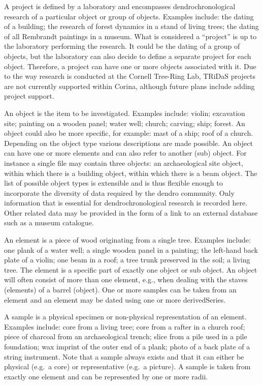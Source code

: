 \begin{description*}
\item[A project] is defined by a laboratory and encompasses dendrochronological research of a particular object or group of objects.  Examples include: the dating of a building; the research of forest dynamics in a stand of living trees; the dating of all Rembrandt paintings in a museum. What is considered a ``project'' is up to the laboratory performing the research. It could be the dating of a group of objects, but the laboratory can also decide to define a separate project for each object. Therefore, a project can have one or more objects associated with it.  Due to the way research is conducted at the Cornell Tree-Ring Lab, TRiDaS projects are not currently supported within Corina, although future plans include adding project support.

\item[An object] is the item to be investigated.  Examples include: violin; excavation site; painting on a wooden panel; water well; church; carving; ship; forest. An object could also be more specific, for example: mast of a ship; roof of a church. Depending on the object type various descriptions are made possible. An object can have one or more elements and can also refer to another (sub) object.  For instance a single file may contain three objects: an archaeological site object, within which there is a building object, within which there is a beam object.  The list of possible object types is extensible and is thus flexible enough to incorporate the diversity of data required by the dendro community.  Only information that is essential for dendrochronological research is recorded here. Other related data may be provided in the form of a link to an external database such as a museum catalogue. 

\item[An element] is a piece of wood originating from a single tree. Examples include: one plank of a water well; a single wooden panel in a painting; the left-hand back plate of a violin; one beam in a roof; a tree trunk preserved in the soil; a living tree. The element is a specific part of exactly one object or sub object.  An object will often consist of more than one element, e.g., when dealing with the staves (elements) of a barrel (object).  One or more samples can be taken from an element and an element may be dated using one or more derivedSeries.

\item[A sample] is a physical specimen or non-physical representation of an element. Examples include: core from a living tree; core from a rafter in a church roof; piece of charcoal from an archaeological trench; slice from a pile used in a pile foundation; wax imprint of the outer end of a plank; photo of a back plate of a string instrument. Note that a sample always exists and that it can either be physical (e.g.\ a core) or representative (e.g.\ a picture). A sample is taken from exactly one element and can be represented by one or more radii.


\end{description*}
